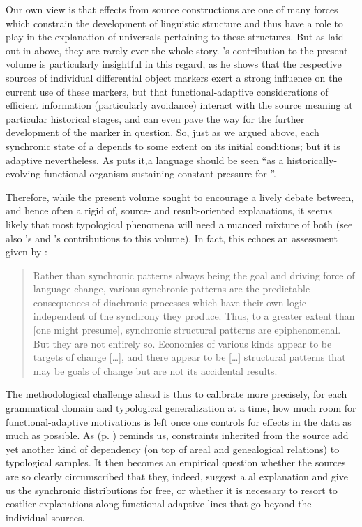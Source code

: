 \documentclass[output=paper]{langsci/langscibook}
\begin{document}
Our own view is that  effects from source constructions are one of many forces which constrain the development of linguistic structure and thus have a role to play in the explanation of universals pertaining to these structures. But as laid out in  above, they are rarely ever the whole story. ’s contribution to the present volume is particularly insightful in this regard, as he shows that the respective sources of individual differential object markers exert a strong influence on the current use of these markers, but that functional-adaptive considerations of efficient information  (particularly  avoidance) interact with the source meaning at particular historical stages, and can even pave the way for the further development of the marker in question. So, just as we argued above, each synchronic state of a  depends to some extent on its initial conditions; but it is adaptive nevertheless. As \citet[263]{Shibatani2006} puts it,\largerpage a language should be seen “as a historically-evolving functional organism sustaining constant pressure for ”. 

Therefore, while the present volume sought to encourage a lively debate between, and hence often a rigid  of, source- and result-oriented explanations, it seems likely that most typological phenomena will need a nuanced mixture of both (see also ’s and ’s contributions to this volume). In fact, this echoes an assessment given by \citet[287--288]{Nichols2008_Diach}:

\begin{quote}
Rather than synchronic patterns always being the goal and driving force of language change, various synchronic patterns are the predictable consequences of diachronic processes which have their own logic independent of the synchrony they produce. Thus, to a greater extent than [one might presume], synchronic structural patterns are epiphenomenal. But they are not entirely so. Economies of various kinds appear to be targets of change […], and there appear to be […] structural patterns that may be goals of change but are not its accidental results.
\end{quote}

The methodological challenge ahead is thus to calibrate more precisely, for each grammatical domain and typological generalization at a time, how much room for functional-adaptive motivations is left once one controls for  effects in the data as much as possible. As  (p. \pageref{p:collins:dependency}) reminds us, constraints inherited from the source add yet another kind of dependency (on top of areal and genealogical relations) to typological samples. It then becomes an empirical question whether the sources are so clearly circumscribed that they, indeed, suggest a al explanation and give us the synchronic distributions for free, or whether it is necessary to resort to costlier explanations along functional-adaptive lines that go beyond the individual sources.
\end{document}
